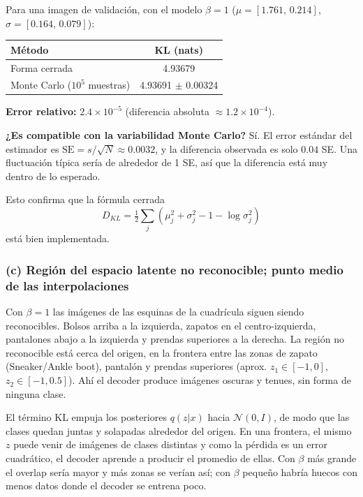\documentclass[11pt]{article}
\begin{document}
Para una imagen de validación, con el modelo $\beta=1$ ($\mu=[1.761,\,0.214]$, $\sigma=[0.164,\,0.079]$):
\begin{table}[H]
\centering
\begin{tabular}{lc}
\toprule
Método & KL (nats) \\
\midrule
Forma cerrada & 4.93679 \\
Monte Carlo ($10^5$ muestras) & 4.93691 $\pm$ 0.00324 \\
\bottomrule
\end{tabular}
\end{table}

\textbf{Error relativo:} $2.4\times10^{-5}$ (diferencia absoluta $\approx 1.2\times10^{-4}$).

\textbf{¿Es compatible con la variabilidad Monte Carlo?} Sí. El error estándar del estimador es $\text{SE}=s/\sqrt{N}\approx0.0032$, y la diferencia observada es solo $0.04$ SE. Una fluctuación típica sería de alrededor de 1 SE, así que la diferencia está muy dentro de lo esperado.

Esto confirma que la fórmula cerrada
\[D_{KL}=\tfrac12\sum_j\left(\mu_j^2+\sigma_j^2-1-\log\sigma_j^2\right)\]
está bien implementada.

\subsubsection*{(c) Región del espacio latente no reconocible; punto medio de las interpolaciones}
Con $\beta=1$ las imágenes de las esquinas de la cuadrícula siguen siendo reconocibles. Bolsos arriba a la izquierda, zapatos en el centro-izquierda, pantalones abajo a la izquierda y prendas superiores a la derecha. La región no reconocible está cerca del origen, en la frontera entre las zonas de zapato (Sneaker/Ankle boot), pantalón y prendas superiores (aprox. $z_1\in[-1,0]$, $z_2\in[-1,0.5]$). Ahí el decoder produce imágenes oscuras y tenues, sin forma de ninguna clase.

El término KL empuja los posteriores $q(z|x)$ hacia $\mathcal N(0,I)$, de modo que las clases quedan juntas y solapadas alrededor del origen. En una frontera, el mismo $z$ puede venir de imágenes de clases distintas y como la pérdida es un error cuadrático, el decoder aprende a producir el promedio de ellas. Con $\beta$ más grande el overlap sería mayor y más zonas se verían así; con $\beta$ pequeño habría huecos con menos datos donde el decoder se entrena poco.
\end{document}

